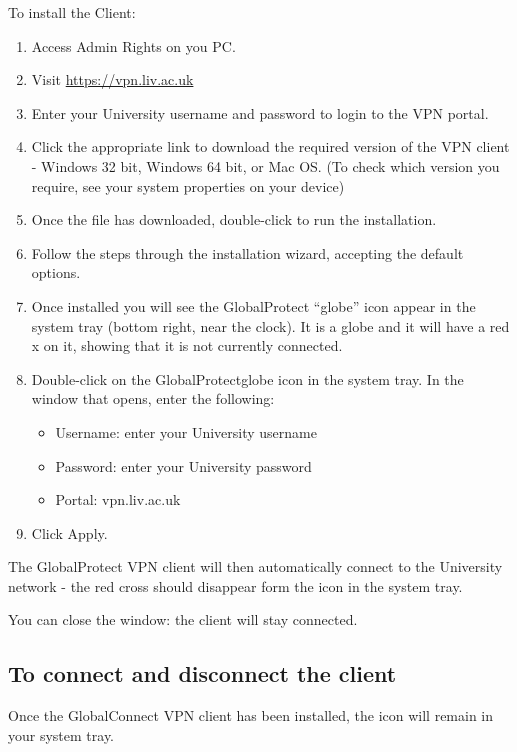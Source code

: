 \documentclass[
]{book}
\providecommand{\tightlist}{%
  \setlength{\itemsep}{0pt}\setlength{\parskip}{0pt}}
\begin{document}
To install the Client:

\begin{enumerate}
\def\labelenumi{\arabic{enumi})}
\item
  Access Admin Rights on you PC.
\item
  Visit \url{https://vpn.liv.ac.uk}
\item
  Enter your University username and password to login to the VPN portal.
\item
  Click the appropriate link to download the required version of the VPN client - Windows 32 bit, Windows 64 bit, or Mac OS.
  (To check which version you require, see your system properties on your device)
\item
  Once the file has downloaded, double-click to run the installation.
\item
  Follow the steps through the installation wizard, accepting the default options.
\item
  Once installed you will see the GlobalProtect ``globe'' icon appear in the system tray (bottom right, near the clock).
  It is a globe and it will have a red x on it, showing that it is not currently connected.
\item
  Double-click on the GlobalProtectglobe icon in the system tray. In the window that opens, enter the following:

  \begin{itemize}
  \tightlist
  \item
    Username: enter your University username
  \item
    Password: enter your University password
  \item
    Portal: vpn.liv.ac.uk
  \end{itemize}
\item
  Click Apply.
\end{enumerate}

The GlobalProtect VPN client will then automatically connect to the University network - the red cross should disappear form the icon in the system tray.

You can close the window: the client will stay connected.

\hypertarget{to-connect-and-disconnect-the-client}{%
\subsection{To connect and disconnect the client}\label{to-connect-and-disconnect-the-client}}

Once the GlobalConnect VPN client has been installed, the icon will remain in your system tray.
\end{document}
